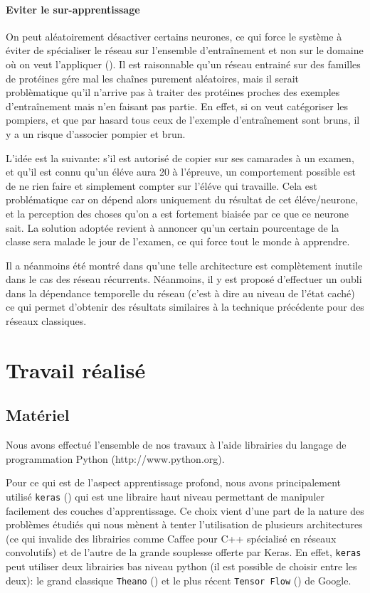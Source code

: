\documentclass[a4paper, journal, 11pt, onecolumn]{IEEEtran}
\begin{document}
\paragraph{Eviter le sur-apprentissage}
  
On peut aléatoirement désactiver certains neurones, ce qui force le système à
 éviter de spécialiser le réseau sur l'ensemble d'entraînement et non sur
le domaine où on veut l'appliquer (\cite{srivastava2014dropout}). Il est raisonnable qu'un réseau
entrainé sur des familles de protéines gére mal les chaînes purement
aléatoires, mais il serait problèmatique qu'il n'arrive pas à
traiter des protéines proches des exemples d'entraînement mais n'en faisant
pas partie. En effet, si on veut catégoriser les pompiers, et que par hasard
tous ceux de l'exemple d'entraînement sont bruns, il y a un risque d'associer
pompier et brun.

L'idée est la suivante: s'il est autorisé de copier sur ses camarades à un
examen, et qu'il est connu qu'un éléve aura 20 à l'épreuve, un comportement
possible est de ne rien faire et simplement compter sur l'éléve qui travaille.
Cela est problématique car on dépend alors uniquement du résultat de cet
éléve/neurone, et la perception des choses qu'on a est fortement biaisée par ce
que ce neurone sait. La solution adoptée revient à annoncer qu'un certain
pourcentage de la classe sera malade le jour de l'examen, ce qui force tout le
monde à apprendre.

Il a néanmoins été montré dans \cite{gal2015theoretically} qu'une telle
architecture est complètement inutile dans le cas des réseau récurrents.
Néanmoins, il y est proposé d'effectuer un oubli dans la dépendance temporelle
du réseau (c'est à dire au niveau de l'état caché) ce qui permet d'obtenir des
résultats similaires à la technique précédente pour des réseaux classiques.

\section{Travail réalisé}

\subsection{Matériel}

Nous avons effectué l'ensemble de nos travaux à l'aide librairies du langage de
programmation Python (http://www.python.org).

Pour ce qui est de l'aspect apprentissage profond, nous avons principalement
utilisé \texttt{keras} (\cite{chollet2015keras}) qui est une libraire haut niveau
permettant de manipuler facilement des couches d'apprentissage. Ce choix vient
d'une part de la nature des problèmes étudiés qui nous mènent à tenter
l'utilisation de plusieurs architectures (ce qui invalide des librairies comme
Caffee pour C++ spécialisé en réseaux convolutifs) et de l'autre de la grande
souplesse offerte par Keras. En effet, \texttt{keras} peut utiliser deux
librairies bas niveau python (il est possible de choisir entre les deux): le
grand classique \texttt{Theano} (\cite{2016arXiv160502688full}) et le plus récent
\texttt{Tensor Flow} (\cite{tensorflow2015-whitepaper}) de Google.
\end{document}
